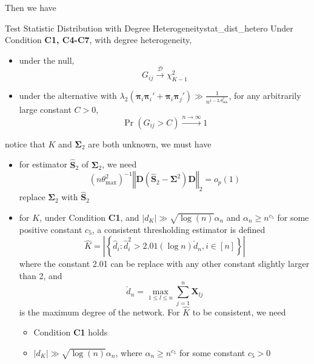 \documentclass[twoside]{article}
\begin{document}
Then we have 
\begin{theorem}{Test Statistic Distribution with Degree Heterogeneity}{stat_dist_hetero}
    Under Condition \textbf{C1, C4-C7}, with degree heterogeneity, 
    \begin{itemize}
        \item under the null, $$ G_{ij} \xrightarrow{\mathcal{D}} \chi^2_{K-1} $$
        \item under the alternative with $\lambda_2 \left(\boldsymbol{\pi}_i\boldsymbol{\pi}_i' + \boldsymbol{\pi}_i \boldsymbol{\pi}_j'\right) \gg \frac{1}{n^{1-2_c\theta^2_{\min}}}$, for any arbitrarily large constant $C>0$, $$ \Pr(G_{ij}>C)\xrightarrow{n\rightarrow\infty} 1 $$
    \end{itemize}
\end{theorem}
notice that $K$ and $\boldsymbol{\Sigma}_2$ are both unknown, we must have 
\begin{itemize}
    \item for estimator $\hat{\mathbf{S}}_2$ of $\boldsymbol{\Sigma}_2$, we need $$\left(n\theta^2_{\max}\right)^{-1} \left\Vert \mathbf{D}\left(\hat{\mathbf{S}}_2 -\boldsymbol{\Sigma}^2\right)\mathbf{D} \right\Vert _2 = o_p(1)$$ replace $\boldsymbol{\Sigma}_2$ with $\hat{\mathbf{S}}_2$
    \item for $K$, under Condition \textbf{C1}, and $\left\vert d_K \right\vert \gg \sqrt{\log(n)}\alpha_n$ and $\alpha_n\geq n^{c_5}$ for some positive constant $c_5$, a consistent thresholding estimator is defined 
    $$
    \hat{K} = \left\vert \left\{ \hat{d}_i: \hat{d}_i^2 > 2.01(\log n) \check{d}_n,i\in[n] \right\} \right\vert 
    $$
    where the constant 2.01 can be replace with any other constant slightly larger than 2, and $$\check{d}_n = \max_{1\leq l\leq n} \sum^n_{j=1}\mathbf{X}_{lj}$$ is the maximum degree of the network. For $\hat{K}$ to be consistent, we need 
    \begin{itemize}
        \item Condition \textbf{C1} holds
        \item $\left\vert d_K \right\vert \gg \sqrt{\log(n)}\alpha_n$, where $\alpha_n\geq n^{c_5}$ for some constant $c_5>0$
    \end{itemize}
\end{itemize}
\end{document}
